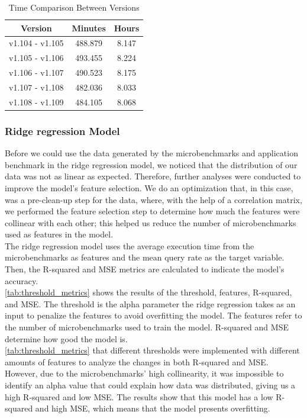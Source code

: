 \begin{table}[ht]
    \centering
    
    \begin{tabular}{c c c} %
        \toprule
        \textbf{Version} & \textbf{Minutes} & \textbf{Hours} \\
        \midrule
        v1.104 - v1.105 & 488.879 & 8.147 \\
        v1.105 - v1.106 & 493.455 & 8.224 \\
        v1.106 - v1.107 & 490.523 & 8.175 \\
        v1.107 - v1.108 & 482.036 & 8.033 \\
        v1.108 - v1.109 & 484.105 & 8.068 \\
        \bottomrule
    \end{tabular}
    \caption{Time Comparison Between Versions}
    \label{tab:version_time}
\end{table}


\subsubsection{Ridge regression Model}
Before we could use the data generated by the microbenchmarks and application benchmark in the ridge regression model, we noticed that the distribution of our data was not as linear as expected. Therefore, further analyses were conducted to improve the model's feature selection. We do an optimization that, in this case, was a pre-clean-up step for the data, where, with the help of a correlation matrix, we performed the feature selection step to determine how much the features were collinear with each other; this helped us reduce the number of microbenchmarks used as features in the model. \\
The ridge regression model uses the average execution time from the microbenchmarks as features and the mean query rate as the target variable. Then, the R-squared and \ac{MSE} metrics are calculated to indicate the model's accuracy.  \\
\cref{tab:threshold_metrics} shows the results of the threshold, features, R-squared, and \ac{MSE}. The threshold is the alpha parameter the ridge regression takes as an input to penalize the features to avoid overfitting the model. The features refer to the number of microbenchmarks used to train the model. R-squared and \ac{MSE} determine how good the model is.  \\
\cref{tab:threshold_metrics} that different thresholds were implemented with different amounts of features to analyze the changes in both R-squared and \ac{MSE}. However, due to the microbenchmarks' high collinearity, it was impossible to identify an alpha value that could explain how data was distributed, giving us a high R-squared and low \ac{MSE}. The results show that this model has a low R-squared and high \ac{MSE}, which means that the model presents overfitting. 

